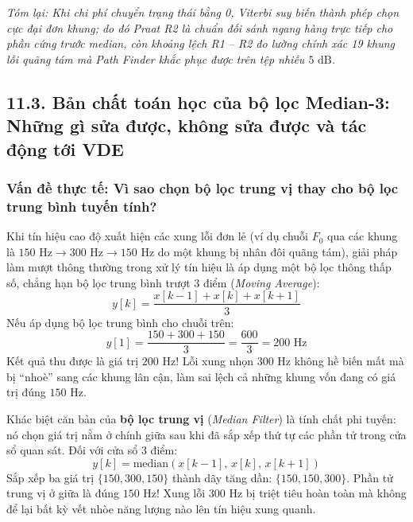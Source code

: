 \textit{Tóm lại: Khi chi phí chuyển trạng thái bằng 0, Viterbi suy biến thành phép chọn cực đại đơn khung; do đó Praat R2 là chuẩn đối sánh ngang hàng trực tiếp cho phần cứng trước median, còn khoảng lệch R1 -- R2 đo lường chính xác 19 khung lỗi quãng tám mà Path Finder khắc phục được trên tệp nhiễu $5\text{ dB}$.}

\subsection*{11.3. Bản chất toán học của bộ lọc Median-3: Những gì sửa được, không sửa được và tác động tới VDE}

\subsubsection*{Vấn đề thực tế: Vì sao chọn bộ lọc trung vị thay cho bộ lọc trung bình tuyến tính?}
Khi tín hiệu cao độ xuất hiện các xung lỗi đơn lẻ (ví dụ chuỗi $F_0$ qua các khung là $150\text{ Hz} \to 300\text{ Hz} \to 150\text{ Hz}$ do một khung bị nhân đôi quãng tám), giải pháp làm mượt thông thường trong xử lý tín hiệu là áp dụng một bộ lọc thông thấp số, chẳng hạn bộ lọc trung bình trượt 3 điểm (\emph{Moving Average}):
\begin{equation}
    y[k] = \frac{x[k-1] + x[k] + x[k+1]}{3}
\end{equation}
Nếu áp dụng bộ lọc trung bình cho chuỗi trên:
\begin{equation}
    y[1] = \frac{150 + 300 + 150}{3} = \frac{600}{3} = 200\text{ Hz}
\end{equation}
Kết quả thu được là giá trị $200\text{ Hz}$! Lỗi xung nhọn $300\text{ Hz}$ không hề biến mất mà bị ``nhoè'' sang các khung lân cận, làm sai lệch cả những khung vốn đang có giá trị đúng $150\text{ Hz}$.

Khác biệt căn bản của \textbf{bộ lọc trung vị} (\emph{Median Filter}) là tính chất phi tuyến: nó chọn giá trị nằm ở chính giữa sau khi đã sắp xếp thứ tự các phần tử trong cửa sổ quan sát. Đối với cửa sổ 3 điểm:
\begin{equation}
    y[k] = \text{median}(x[k-1],\, x[k],\, x[k+1])
\end{equation}
Sắp xếp ba giá trị $\{150, 300, 150\}$ thành dãy tăng dần: $\{150, 150, 300\}$. Phần tử trung vị ở giữa là đúng $150\text{ Hz}$! Xung lỗi $300\text{ Hz}$ bị triệt tiêu hoàn toàn mà không để lại bất kỳ vết nhòe năng lượng nào lên tín hiệu xung quanh.

